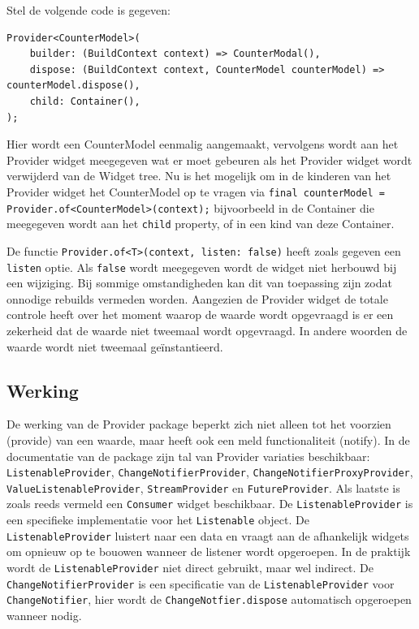 Stel de volgende code is gegeven:
\begin{verbatim}
Provider<CounterModel>(
    builder: (BuildContext context) => CounterModal(),
    dispose: (BuildContext context, CounterModel counterModel) => counterModel.dispose(),
    child: Container(),
);
\end{verbatim}

Hier wordt een CounterModel eenmalig aangemaakt, vervolgens wordt aan het Provider widget meegegeven wat er moet gebeuren als het Provider widget wordt verwijderd van de Widget tree. Nu is het mogelijk om in de kinderen van het Provider widget het CounterModel op te vragen via \verb|final counterModel = Provider.of<CounterModel>(context);|
bijvoorbeeld in de Container die meegegeven wordt aan het \verb|child| property, of in een kind van deze Container.

De functie \verb|Provider.of<T>(context, listen: false)| heeft zoals gegeven een \verb|listen| optie. Als \verb|false| wordt meegegeven wordt de widget niet herbouwd bij een wijziging. Bij sommige omstandigheden kan dit van toepassing zijn zodat onnodige rebuilds vermeden worden. Aangezien de Provider widget de totale controle heeft over het moment waarop de waarde wordt opgevraagd is er een zekerheid dat de waarde niet tweemaal wordt opgevraagd. In andere woorden de waarde wordt niet tweemaal geïnstantieerd.

\subsection*{Werking}
De werking van de Provider package beperkt zich niet alleen tot het voorzien (provide) van een waarde, maar heeft ook een meld functionaliteit (notify).
In de documentatie van de package zijn tal van Provider variaties beschikbaar: \verb|ListenableProvider|, \verb|ChangeNotifierProvider|, \verb|ChangeNotifierProxyProvider|, \verb|ValueListenableProvider|, \verb|StreamProvider| en \verb|FutureProvider|. Als laatste is zoals reeds vermeld een \verb|Consumer| widget beschikbaar.
De \verb|ListenableProvider| is een specifieke implementatie voor het \verb|Listenable| object. De \verb|ListenableProvider| luistert naar een data en vraagt aan de afhankelijk widgets om opnieuw op te bouowen wanneer de listener wordt opgeroepen. In de praktijk wordt de \verb|ListenableProvider| niet direct gebruikt, maar wel indirect. De \verb|ChangeNotifierProvider| is een specificatie van de \verb|ListenableProvider| voor \verb|ChangeNotifier|, hier wordt de \verb|ChangeNotfier.dispose| automatisch opgeroepen wanneer nodig.

